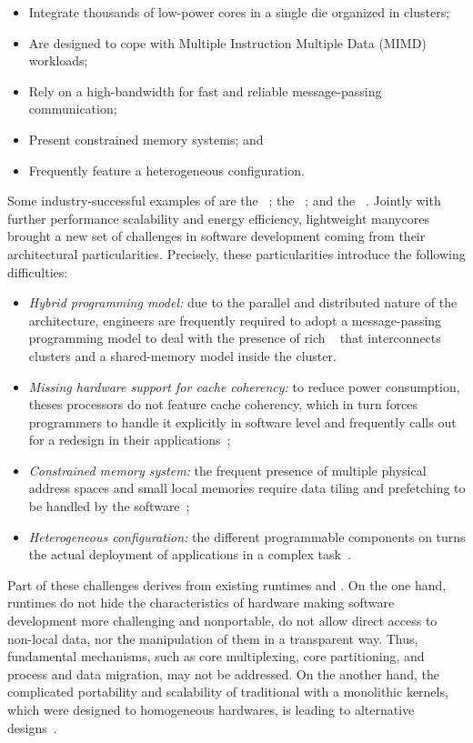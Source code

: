 	\begin{itemize}
		\item Integrate thousands of low-power cores in a single die organized in clusters;
		\item Are designed to cope with Multiple Instruction Multiple Data (MIMD) workloads;
		\item Rely on a high-bandwidth \noc for fast and reliable message-passing communication;
		\item Present constrained memory systems; and
		\item Frequently feature a heterogeneous configuration.
	\end{itemize}

	Some industry-successful examples of \lightweight \manycores are
	the \mppa~\cite{DeDinechin2013-1};
	the \epiphany~\cite{olofsson2014}; and
	the \taihulight~\cite{zheng2015}.
	Jointly with further performance scalability and energy efficiency, lightweight manycores brought
	a new set of challenges in software development coming from their architectural particularities.
	Precisely, these particularities introduce the following difficulties:
	\begin{itemize}
		\item \textit{Hybrid programming model:} due to the parallel and distributed nature of
			the architecture, engineers are frequently required to adopt a message-passing
			programming model to deal with the presence of rich \nocs~\cite{kelly2013} that
			interconnects clusters and a shared-memory model inside the cluster.
		\item \textit{Missing hardware support for cache coherency:} to reduce power consumption,
			theses processors do not feature cache coherency, which in turn forces programmers to
			handle it explicitly in software level and frequently calls out for a redesign in their
			applications~\cite{francesquini2015};
		\item \textit{Constrained memory system:} the frequent presence of multiple physical
			address spaces and small local memories require data tiling and prefetching to be
			handled by the software~\cite{Castro2016};
		\item \textit{Heterogeneous configuration:} the different programmable components on
			\lightweight \manycores turns the actual deployment of applications in a
			complex task~\cite{barbalace2015}.
	\end{itemize}

	Part of these challenges derives from existing runtimes and \oss.
	On the one hand, runtimes do not hide the characteristics of hardware making
	software development more challenging and nonportable, \eg do not allow
	direct access to non-local data, nor the manipulation of them in a transparent way.
	Thus, fundamental \os mechanisms, such as core multiplexing, core partitioning,
	and process and data migration, may not be addressed.
	On the another hand, the complicated portability and scalability of traditional \oss with a
	monolithic kernels, which were designed to homogeneous hardwares, is leading to alternative
	\os designs~\cite{Baumann2009, kluge2014, nightingale2009, rhoden2011}.

